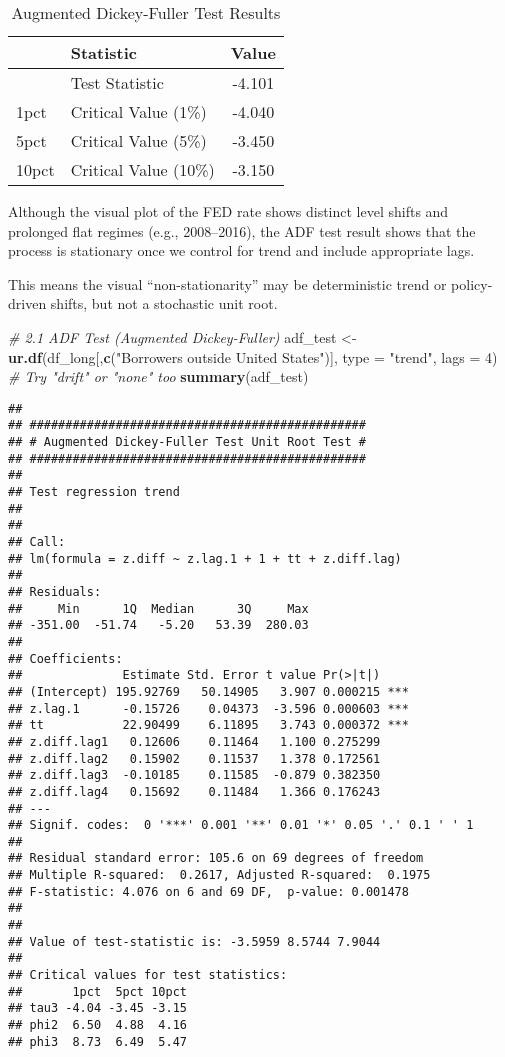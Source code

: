\documentclass[
]{article}
\newenvironment{Shaded}{\begin{snugshade}}{\end{snugshade}}
\newcommand{\AttributeTok}[1]{\textcolor[rgb]{0.13,0.29,0.53}{#1}}
\newcommand{\CommentTok}[1]{\textcolor[rgb]{0.56,0.35,0.01}{\textit{#1}}}
\newcommand{\DecValTok}[1]{\textcolor[rgb]{0.00,0.00,0.81}{#1}}
\newcommand{\FunctionTok}[1]{\textcolor[rgb]{0.13,0.29,0.53}{\textbf{#1}}}
\newcommand{\NormalTok}[1]{#1}
\newcommand{\OtherTok}[1]{\textcolor[rgb]{0.56,0.35,0.01}{#1}}
\newcommand{\StringTok}[1]{\textcolor[rgb]{0.31,0.60,0.02}{#1}}
\begin{document}
\begingroup\fontsize{10}{12}\selectfont

\begin{longtable}[t]{llc}
\caption{\label{tab:unnamed-chunk-6}Augmented Dickey-Fuller Test Results}\\
\toprule
 & Statistic & Value\\
\midrule
 & Test Statistic & -4.101\\
1pct & Critical Value (1\%) & -4.040\\
5pct & Critical Value (5\%) & -3.450\\
10pct & Critical Value (10\%) & -3.150\\
\bottomrule
\end{longtable}
\endgroup{}

Although the visual plot of the FED rate shows distinct level shifts and
prolonged flat regimes (e.g., 2008--2016), the ADF test result shows
that the process is stationary once we control for trend and include
appropriate lags.

This means the visual ``non-stationarity'' may be deterministic trend or
policy-driven shifts, but not a stochastic unit root.

\begin{Shaded}
\begin{Highlighting}[]
\CommentTok{\# 2.1 ADF Test (Augmented Dickey{-}Fuller)}
\NormalTok{adf\_test }\OtherTok{\textless{}{-}} \FunctionTok{ur.df}\NormalTok{(df\_long[,}\FunctionTok{c}\NormalTok{(}\StringTok{"Borrowers outside United States"}\NormalTok{)], }\AttributeTok{type =} \StringTok{"trend"}\NormalTok{, }\AttributeTok{lags =} \DecValTok{4}\NormalTok{)  }\CommentTok{\# Try "drift" or "none" too}
\FunctionTok{summary}\NormalTok{(adf\_test)}
\end{Highlighting}
\end{Shaded}

\begin{verbatim}
## 
## ############################################### 
## # Augmented Dickey-Fuller Test Unit Root Test # 
## ############################################### 
## 
## Test regression trend 
## 
## 
## Call:
## lm(formula = z.diff ~ z.lag.1 + 1 + tt + z.diff.lag)
## 
## Residuals:
##     Min      1Q  Median      3Q     Max 
## -351.00  -51.74   -5.20   53.39  280.03 
## 
## Coefficients:
##              Estimate Std. Error t value Pr(>|t|)    
## (Intercept) 195.92769   50.14905   3.907 0.000215 ***
## z.lag.1      -0.15726    0.04373  -3.596 0.000603 ***
## tt           22.90499    6.11895   3.743 0.000372 ***
## z.diff.lag1   0.12606    0.11464   1.100 0.275299    
## z.diff.lag2   0.15902    0.11537   1.378 0.172561    
## z.diff.lag3  -0.10185    0.11585  -0.879 0.382350    
## z.diff.lag4   0.15692    0.11484   1.366 0.176243    
## ---
## Signif. codes:  0 '***' 0.001 '**' 0.01 '*' 0.05 '.' 0.1 ' ' 1
## 
## Residual standard error: 105.6 on 69 degrees of freedom
## Multiple R-squared:  0.2617, Adjusted R-squared:  0.1975 
## F-statistic: 4.076 on 6 and 69 DF,  p-value: 0.001478
## 
## 
## Value of test-statistic is: -3.5959 8.5744 7.9044 
## 
## Critical values for test statistics: 
##       1pct  5pct 10pct
## tau3 -4.04 -3.45 -3.15
## phi2  6.50  4.88  4.16
## phi3  8.73  6.49  5.47
\end{verbatim}
\end{document}
